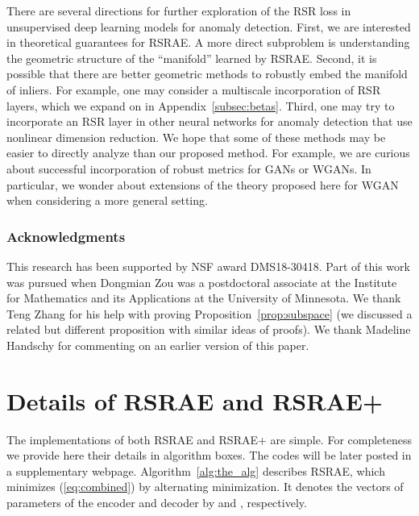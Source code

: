 \documentclass{article} \usepackage{iclr2020_conference,times}
\def\eqref#1{(\ref{#1})}
\begin{document}
There are several directions for further exploration of the RSR loss in unsupervised deep learning models for anomaly detection. First, we are interested in theoretical guarantees for RSRAE. A more direct subproblem is understanding the geometric structure of the ``manifold'' learned by RSRAE. 
Second, it is possible that there are better geometric methods to robustly embed the manifold of inliers. For example, one may consider a multiscale incorporation of RSR layers, which we expand on in Appendix~\ref{subsec:betas}.
Third, one may try to incorporate an RSR layer in other neural networks for anomaly detection that use nonlinear dimension reduction. We hope that some of these methods may be easier to directly analyze than our proposed method. For example, we are curious about successful incorporation of robust metrics for GANs or WGANs. In particular, we wonder about extensions of the theory proposed here for WGAN when considering a more general setting.

\subsubsection*{Acknowledgments}
\label{subsubsec: acknowledgement}
This research has been supported by NSF award DMS18-30418. Part of this work was pursued when Dongmian Zou was a postdoctoral associate at the Institute for Mathematics and its Applications at the University of Minnesota. We thank Teng Zhang for his help with proving
Proposition~\ref{prop:subspace} (we discussed a related but different proposition with similar ideas of proofs). We thank Madeline
Handschy for commenting on an earlier version of this paper. 








\newpage

\appendix


\section{Details of RSRAE and RSRAE+}
\label{sec:alg}

The implementations of both RSRAE and RSRAE+ are simple. For completeness we provide here their details in algorithm boxes. The codes will be later posted in a supplementary webpage.  Algorithm~\ref{alg:the_alg} describes RSRAE, which minimizes \eqref{eq:combined} by alternating minimization. It denotes the vectors of parameters of the encoder and decoder by  and , respectively.
\end{document}
